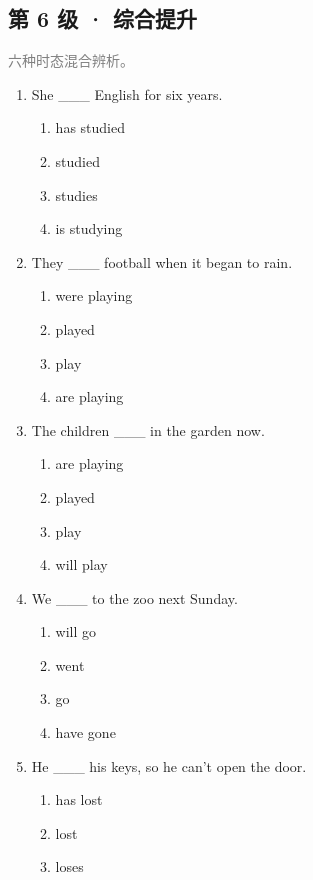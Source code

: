 \documentclass[11pt,a4paper]{ctexart}
\begin{document}
\subsection*{第 6 级 · 综合提升}
\noindent\textcolor{gray}{六种时态混合辨析。}\par\smallskip
\begin{enumerate}[leftmargin=*,itemsep=4pt]
\item She \_\_\_ English for six years.
\begin{enumerate}[label=\Alph*.,leftmargin=2em,itemsep=1pt,topsep=2pt]
\item has studied
\item studied
\item studies
\item is studying
\end{enumerate}
\item They \_\_\_ football when it began to rain.
\begin{enumerate}[label=\Alph*.,leftmargin=2em,itemsep=1pt,topsep=2pt]
\item were playing
\item played
\item play
\item are playing
\end{enumerate}
\item The children \_\_\_ in the garden now.
\begin{enumerate}[label=\Alph*.,leftmargin=2em,itemsep=1pt,topsep=2pt]
\item are playing
\item played
\item play
\item will play
\end{enumerate}
\item We \_\_\_ to the zoo next Sunday.
\begin{enumerate}[label=\Alph*.,leftmargin=2em,itemsep=1pt,topsep=2pt]
\item will go
\item went
\item go
\item have gone
\end{enumerate}
\item He \_\_\_ his keys, so he can’t open the door.
\begin{enumerate}[label=\Alph*.,leftmargin=2em,itemsep=1pt,topsep=2pt]
\item has lost
\item lost
\item loses

\end{enumerate}
\end{enumerate}
\end{document}
